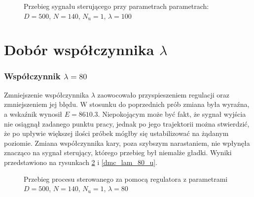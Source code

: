 \begin{figure}[b]
    \centering
    \caption{Przebieg sygnału sterującego przy parametrach parametrach: $D = 500$, $N = 140$, $N_{\mathrm{u}} = 1$, $\lambda = 100$}
    \label{dmc_Nu_1_u}
\end{figure}

\section{Dobór współczynnika $\lambda$}
\subsubsection{Współczynnik $\lambda = 80$}
Zmniejszenie współczynnika $\lambda$ zaowocowało przyspieszeniem regulacji oraz zmniejszeniem jej błędu. W stosunku do poprzednich prób zmiana była wyraźna, a wskaźnik wynosił $E = \num{8610,3}$. Niepokojącym może być fakt, że sygnał wyjścia nie osiągnął zadanego punktu pracy, jednak po jego trajektorii można stwierdzić, że po upływie większej ilości próbek mógłby się ustabilizować na żądanym poziomie. Zmiana współczynnika kary, poza szybszym narastaniem, nie wpłynęła znacząco na sygnał sterujący, którego przebieg był niemalże gładki. Wyniki przedstawiono na rysunkach \ref{dmc_lam_80_y} i \ref{dmc_lam_80_u}.

\begin{figure}[t]
    \centering
    \caption{Przebieg procesu sterowanego za pomocą regulatora z parametrami $D = 500$, $N = 140$, $N_{\mathrm{u}} = 1$, $\lambda = 80$}
    \label{dmc_lam_80_y}
\end{figure}

